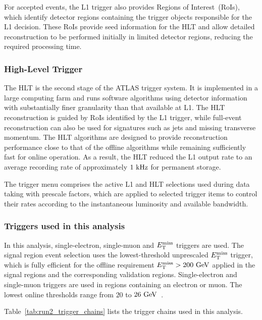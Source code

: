 For accepted events, the L1 trigger also provides Regions of Interest~(RoIs), which identify detector regions containing the trigger objects responsible for the L1 decision.
These RoIs provide seed information for the HLT and allow detailed reconstruction to be performed initially in limited detector regions, reducing the required processing time.

\subsubsection*{High-Level Trigger}

The HLT is the second stage of the ATLAS trigger system.
It is implemented in a large computing farm and runs software algorithms using detector information with substantially finer granularity than that available at L1.
The HLT reconstruction is guided by RoIs identified by the L1 trigger, while full-event reconstruction can also be used for signatures such as jets and missing transverse momentum.
The HLT algorithms are designed to provide reconstruction performance close to that of the offline algorithms while remaining sufficiently fast for online operation.
As a result, the HLT reduced the L1 output rate to an average recording rate of approximately $1~\mathrm{kHz}$ for permanent storage.

The trigger menu comprises the active L1 and HLT selections used during data taking with prescale factors, which are applied to selected trigger items to control their rates according to the instantaneous luminosity and available bandwidth.


\subsubsection*{Triggers used in this analysis}

In this analysis, single-electron, single-muon and $E_{\mathrm{T}}^{\mathrm{miss}}$ triggers are used.
The signal region event selection uses the lowest-threshold unprescaled $E_{\mathrm{T}}^{\mathrm{miss}}$ trigger, which is fully efficient for the offline requirement $E_{\mathrm{T}}^{\mathrm{miss}}>200~\mathrm{GeV}$ applied in the signal regions and the corresponding validation regions.
Single-electron and single-muon triggers are used in regions containing an electron or muon.
The lowest online thresholds range from $20$ to $26~\mathrm{GeV}$~\cite{ATLASElectronTriggerRun2,ATLASMuonTriggerRun2}.

Table~\ref{tab:run2_trigger_chains} lists the trigger chains used in this analysis.

